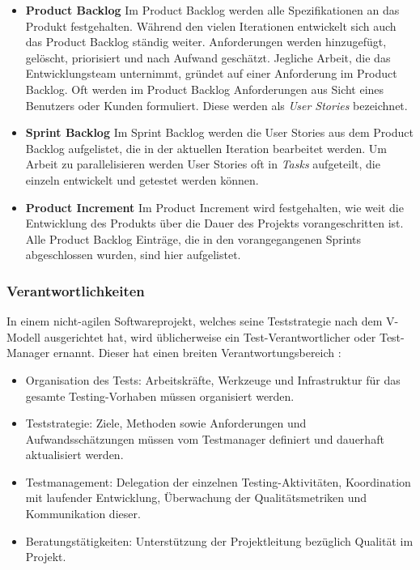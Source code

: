 \begin{itemize}
\item \textbf{Product Backlog} Im Product Backlog werden alle Spezifikationen an das Produkt festgehalten. Während den vielen Iterationen entwickelt sich auch das Product Backlog ständig weiter. Anforderungen werden hinzugefügt, gelöscht, priorisiert und nach Aufwand geschätzt. Jegliche Arbeit, die das Entwicklungsteam unternimmt, gründet auf einer Anforderung im Product Backlog. Oft werden im Product Backlog Anforderungen aus Sicht eines Benutzers oder Kunden formuliert. Diese werden als \textit{User Stories} bezeichnet.
\item \textbf{Sprint Backlog} Im Sprint Backlog werden die User Stories aus dem Product Backlog aufgelistet, die in der aktuellen Iteration bearbeitet werden. Um Arbeit zu parallelisieren werden User Stories oft in \textit{Tasks} aufgeteilt, die einzeln entwickelt und getestet werden können.
\item \textbf{Product Increment} Im Product Increment wird festgehalten, wie weit die Entwicklung des Produkts über die Dauer des Projekts vorangeschritten ist. Alle Product Backlog Einträge, die in den vorangegangenen Sprints abgeschlossen wurden, sind hier aufgelistet.
\end{itemize}


\subsubsection{Verantwortlichkeiten}
In einem nicht-agilen Softwareprojekt, welches seine Teststrategie nach dem V-Modell ausgerichtet hat, wird üblicherweise ein Test-Verantwortlicher oder Test-Manager ernannt. Dieser hat einen breiten Verantwortungsbereich \cite{linz_testing_2014}:

\begin{itemize}
\item Organisation des Tests: Arbeitskräfte, Werkzeuge und Infrastruktur für das gesamte Testing-Vorhaben müssen organisiert werden.
\item Teststrategie: Ziele, Methoden sowie Anforderungen und Aufwandsschätzungen müssen vom Testmanager definiert und dauerhaft aktualisiert werden.
\item Testmanagement: Delegation der einzelnen Testing-Aktivitäten, Koordination mit laufender Entwicklung, Überwachung der Qualitätsmetriken und Kommunikation dieser.
\item Beratungstätigkeiten: Unterstützung der Projektleitung bezüglich Qualität im Projekt.
\end{itemize}

